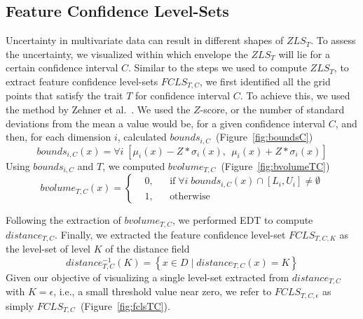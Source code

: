 \vspace{-2mm}
\subsection{Feature Confidence Level-Sets}
\label{sec:fcls}
%
Uncertainty in multivariate data can result in different shapes of $ZLS_{T}$.
%
To assess the uncertainty, we visualized within which envelope the $ZLS_{T}$ will lie for a certain confidence interval $C$.
%
Similar to the steps we used to compute $ZLS_{T}$, to extract feature confidence level-sets $FCLS_{T,C}$, we first identified all the grid points that satisfy the trait $T$ for confidence interval $C$.
%
To achieve this, we used the method by Zehner et al.~\cite{zehner2010visualization}. 
%
We used the $Z$-score, or the number of standard deviations from the mean a value would be, for a given confidence interval $C$, and then, for each dimension $i$, calculated $bounds_{i,C}$~(Figure~\ref{fig:boundsC})
\begin{equation}
bounds_{i,C}(x) = \forall i \; [{\mu}_{i}(x) - Z*{\sigma}_{i}(x),~~{\mu}_{i}(x) + Z*{\sigma}_{i}(x)]
\end{equation}
%
Using $bounds_{i,C}$ and $T$, we computed $bvolume_{T,C}$~(Figure~\ref{fig:bvolumeTC})
\begin{equation}
  bvolume_{T,C}(x) = \left \{
  \begin{aligned}
    &0, && \text{if}\; \forall i\; bounds_{i, C}(x) \cap [L_{i}, U_{i}] \neq \emptyset \\
    &1, && \text{otherwise}
  \end{aligned} \right.
\end{equation}
%

Following the extraction of $bvolume_{T,C}$, we performed EDT to compute $distance_{T,C}$.
%
Finally, we extracted the feature confidence level-set $FCLS_{T,C,K}$ as the level-set of level $K$ of the distance field
%
\begin{equation} 
distance_{T,C}^{-1}(K) = \left\{ x \in D\; |\; distance_{T,C}(x) = K\right\}
\end{equation}
%
Given our objective of visualizing a single level-set extracted from $distance_{T,C}$ with $K = \epsilon$, i.e., a small threshold value near zero, we refer to $FCLS_{T,C,\epsilon}$ as simply $FCLS_{T,C}$~(Figure~\ref{fig:fclsTC}).
%
